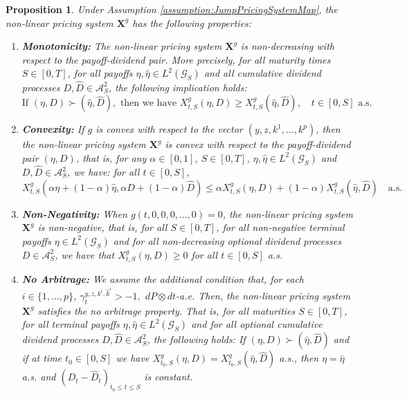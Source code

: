 \documentclass[11pt,a4paper]{article}
\numberwithin{equation}{section}
\theoremstyle{newPlain}
\newtheorem{proposition}[theorem]{Proposition}
\theoremstyle{newDefinition}
\theoremstyle{newRemark}
\begin{document}
\begin{proposition}\label{proposition:Non-linearPricingSystemProperties}
	Under Assumption \ref{assumption:JumpPricingSystemMap}, the non-linear pricing system $\mathbf{X}^g$ has the following properties:
	\begin{enumerate}[label=(\alph*)]
		\item \textbf{Monotonicity:} The non-linear pricing system $\mathbf{X}^g$ is non-decreasing with respect to the payoff-dividend pair. More precisely, for all maturity times $S\in[0,T]$, for all payoffs $\eta,\hat{\eta}\in L^2(\mathcal{G}_S)$ and all cumulative dividend processes $D,\hat{D}\in\mathcal{A}_S^2$, the following implication  holds:
		    \begin{equation*}
		        \text{If }(\eta,D)\succ(\hat{\eta},\hat{D}),\text{ then we have }X_{t,S}^g(\eta,D)\ge X_{t,S}^g(\hat{\eta},\hat{D}),\quad t\in[0,S]\text{ a.s.}
		    \end{equation*}
		\item \textbf{Convexity:} If $g$ is convex with respect to the vector $(y,z,k^1,\ldots,k^p)$, then the non-linear pricing system $\mathbf{X}^g$ is convex with respect to the payoff-dividend pair $(\eta,D)$, that is, for any $\alpha\in[0,1]$, $S\in[0,T]$, $\eta,\hat{\eta}\in L^2(\mathcal{G}_S)$ and $D,\hat{D}\in\mathcal{A}_S^2$, we have: for all $t\in[0,S]$,
		    \begin{equation*}
		        X_{t,S}^g(\alpha\eta + (1-\alpha)\hat{\eta}, \alpha D + (1-\alpha)\hat{D})\le \alpha X_{t,S}^g(\eta,D) + (1-\alpha)X_{t,S}^g(\hat{\eta},\hat{D})\quad\text{a.s.}
		    \end{equation*}
		\item \textbf{Non-Negativity:} When $g(t,0,0,0,\ldots,0)=0$, the non-linear pricing system $\mathbf{X}^g$ is non-negative, that is, for all $S\in[0,T]$, for all non-negative terminal payoffs $\eta\in L^2(\mathcal{G}_S)$ and for all non-decreasing optional dividend processes $D\in\mathcal{A}_S^2$, we have that $X_{t,S}^g(\eta,D)\ge0$ for all $t\in[0,S]$ a.s.
		\item \textbf{No Arbitrage:} We assume  the additional condition that,  for each $i\in\{1,\ldots,p\}$, $\gamma_{t}^{y,z,k^i,\hat{k}^i}>-1,$ $dP\otimes dt$-a.e.  Then,  the non-linear pricing system $\mathbf{X}^g$ satisfies the no arbitrage property. That is, for all maturities $S\in[0,T]$, for all terminal payoffs $\eta,\hat{\eta}\in L^2(\mathcal{G}_S)$ and for all optional cumulative dividend processes $D,\hat{D}\in\mathcal{A}_S^2$, the following holds:
    If $(\eta,D)\succ(\hat{\eta},\hat{D})$ and if at time $t_0\in[0,S]$ we have $X_{t_0,S}^g(\eta,D)=X_{t_0,S}^g(\hat{\eta},\hat{D})$ a.s., then $\eta=\hat{\eta}$ a.s. and $(D_t-\hat{D}_t)_{t_0\le t\le S}$ is constant.
	\end{enumerate}
\end{proposition}
\end{document}
